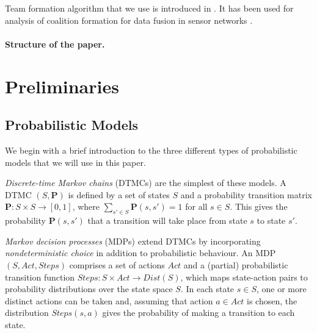 \documentclass{llncs}
\begin{document}
Team formation algorithm that we use is introduced in \cite{gaston2005agent}. It has been used for analysis of coalition formation for data fusion in sensor networks \cite{glinton2008agent}.



\paragraph{Structure of the paper.}


\section{Preliminaries}


\subsection{Probabilistic Models}

We begin with a brief introduction to the three different types of probabilistic models
that we will use in this paper.

\vskip5pt
\emph{Discrete-time Markov chains} (DTMCs) are the simplest of these models.
A DTMC $(S,\mathbf{P})$ is defined by a set of states $S$ and a probability transition matrix
$\mathbf{P} : S\times S \rightarrow [0, 1]$, where $\sum_{s'\in S} \mathbf{P}(s, s') = 1$ for all $s \in  S$.
This gives the probability $\mathbf{P}(s, s')$ that a transition will take place from state $s$ to state $s'$.

\vskip5pt
\emph{Markov decision processes} (MDPs) extend DTMCs by incorporating \emph{nondeterministic choice}
in addition to probabilistic behaviour.
An MDP $(S,Act,Steps)$ comprises a set of actions $Act$
and a (partial) probabilistic transition function $Steps:S\times Act\rightarrow Dist(S)$,
which maps state-action pairs to probability distributions over the state space $S$.
In each state $s\in S$, one or more distinct actions can be taken and, assuming that action $a\in Act$ is chosen,
the distribution $Steps(s,a)$ gives the probability of making a transition to each state.
\end{document}
